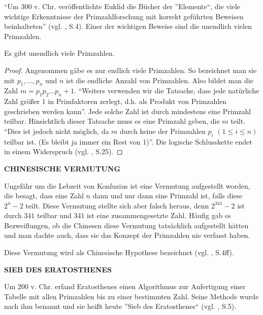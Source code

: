 ``Um 300 v. Chr. veröffentlichte Euklid die Bücher der
”Elemente“, die viele wichtige Erkenntnisse der Primzahlforschung
mit korrekt geführten Beweisen beinhalteten''
(vgl. \cite{sasgabor}, S.4).
Einer der wichtigen Beweise sind die unendlich vielen Primzahlen.

\begin{theorem}
Es gibt unendlich viele Primzahlen.
\end{theorem}
\vspace{-.7cm}

\begin{proof}
Angenommen gäbe es nur endlich viele Primzahlen.
So bezeichnet man sie mit $p_1 ,...,p_n$ und $n$
ist die endliche Anzahl von Primzahlen.
Also bildet man die Zahl $m = p_1 p_2 \dots p_n + 1$.
``Weiters verwenden wir die Tatsache, dass jede 
natürliche Zahl größer $1$ in Primfaktoren zerlegt, 
d.h. als Produkt von Primzahlen geschrieben werden kann''.
Jede solche Zahl ist durch mindestens eine Primzahl teilbar.
Hinsichtlich dieser Tatsache muss es eine Primzahl geben, 
die $m$ teilt. ``Dies ist jedoch nicht möglich, da $m$
durch keine der Primzahlen $p_i$ $(1 \leq i \leq n)$ teilbar
ist. (Es bleibt ja immer ein Rest von 1)''. Die logische
Schlusskette endet in einem Widerspruch
(vgl. \cite{schichlsteinbauer}, S.25).
\end{proof}

\newpage


\textbf{CHINESISCHE VERMUTUNG}

Ungefähr um die Lebzeit von Konfuzius ist eine Vermutung
aufgestellt worden, die besagt, dass eine Zahl $n$ dann
und nur dann eine Primzahl ist, falls diese $2^{n} - 2$
teilt. Diese Vermutung stellte sich aber falsch heraus,
denn $2^{341} - 2$ ist durch $341$ teilbar und $341$ ist
eine zusammengesetzte Zahl. Häufig gab es Bezweiflungen,
ob die Chinesen diese Vermutung tatsächlich aufgestellt
hätten und man dachte auch, dass sie das Konzept der
Primzahlen nie verfasst haben.

Diese Vermutung wird als Chinesische Hypothese bezeichnet
(vgl. \cite{sasgabor}, S.4ff). 
\vspace*{.4cm}

\textbf{SIEB DES ERATOSTHENES}

Um 200 v. Chr. erfand Eratosthenes einen Algorithmus zur
Anfertigung einer Tabelle mit allen Primzahlen bis zu
einer bestimmten Zahl. Seine Methode wurde nach ihm
benannt und sie heißt heute ''Sieb des Eratosthenes``
(vgl. \cite{sasgabor}, S.5).
\vspace*{.4cm}

